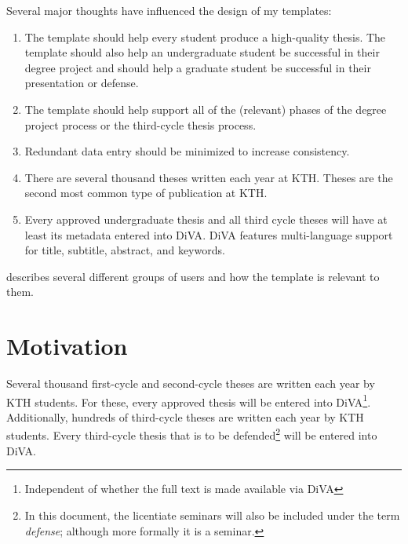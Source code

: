 \documentclass[12pt, twoside]{article}
\begin{document}
Several major thoughts have influenced the design of my templates:
\begin{enumerate}[leftmargin=*, label=\textbf{Thought \arabic*}, ref={Thought \arabic*}]
    \item \label{thought:helpStudent} The template should help every student produce a high-quality thesis. The template should also help an undergraduate student be successful in their degree project and should help a graduate student be successful in their presentation or defense.
    
    \item \label{thought:process} The template should help support all of the (relevant) phases of the degree project process or the third-cycle thesis process.
    
    \item \label{thought:reducingDataEntry} Redundant data entry should be minimized to increase consistency.
    
    \item \label{thought:volume} There are several thousand theses written each year at \gls{KTH}. Theses are the second most common type of publication at \gls{KTH}.
    
    \item \label{thought:inDiVA} Every approved undergraduate thesis and all third cycle theses will have at least its metadata entered into \gls{DiVA}. \gls{DiVA} features multi-language support for title, subtitle, abstract, and keywords.
\end{enumerate}

 describes several different groups of users and how the template is relevant to them.

\section{Motivation}
Several thousand first-cycle and second-cycle theses are written each year by \gls{KTH} students. For these, every approved thesis will be entered into \gls{DiVA}\footnote{Independent of whether the full text is made available via \gls{DiVA}}.  Additionally, hundreds of third-cycle theses are written each year by \gls{KTH} students. Every third-cycle thesis that is to be defended\footnote{In this document, the licentiate seminars will also be included under the term \emph{defense}; although more formally it is a seminar.} will be entered into \gls{DiVA}.
\end{document}
